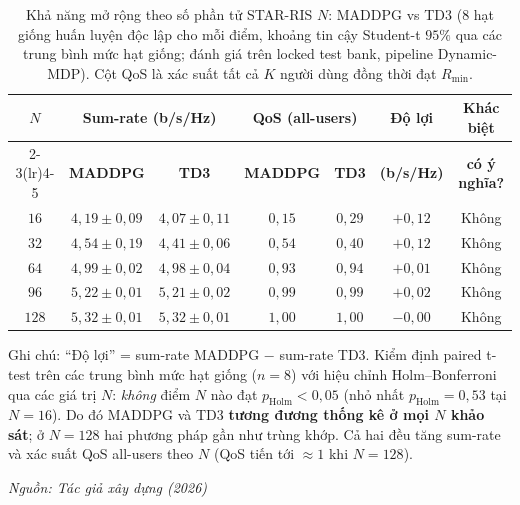 \begin{table}[t]
\centering
\small
\caption{Khả năng mở rộng theo số phần tử STAR-RIS $N$: MADDPG vs TD3 ($8$ hạt giống huấn luyện độc lập cho mỗi điểm, khoảng tin cậy Student-t $95\%$ qua các trung bình mức hạt giống; đánh giá trên locked test bank, pipeline Dynamic-MDP). Cột QoS là xác suất tất cả $K$ người dùng đồng thời đạt $R_{\min}$.}
\label{tab:scalability}
\setlength{\tabcolsep}{4.5pt}
\begin{tabular}{ccccccc}
\toprule
\textbf{$N$} & \multicolumn{2}{c}{\textbf{Sum-rate (b/s/Hz)}} & \multicolumn{2}{c}{\textbf{QoS (all-users)}} & \textbf{Độ lợi} & \textbf{Khác biệt} \\
\cmidrule(lr){2-3}\cmidrule(lr){4-5}
 & \textbf{MADDPG} & \textbf{TD3} & \textbf{MADDPG} & \textbf{TD3} & \textbf{(b/s/Hz)} & \textbf{có ý nghĩa?} \\
\midrule
$16$  & $4{,}19 \pm 0{,}09$ & $4{,}07 \pm 0{,}11$ & $0{,}15$ & $0{,}29$ & $+0{,}12$ & Không \\
$32$  & $4{,}54 \pm 0{,}19$ & $4{,}41 \pm 0{,}06$ & $0{,}54$ & $0{,}40$ & $+0{,}12$ & Không \\
$64$  & $4{,}99 \pm 0{,}02$ & $4{,}98 \pm 0{,}04$ & $0{,}93$ & $0{,}94$ & $+0{,}01$ & Không \\
$96$  & $5{,}22 \pm 0{,}01$ & $5{,}21 \pm 0{,}02$ & $0{,}99$ & $0{,}99$ & $+0{,}02$ & Không \\
$128$ & $5{,}32 \pm 0{,}01$ & $5{,}32 \pm 0{,}01$ & $1{,}00$ & $1{,}00$ & $-0{,}00$ & Không \\
\bottomrule
\end{tabular}

\vspace{0.2em}
{\footnotesize Ghi chú: ``Độ lợi'' = sum-rate MADDPG $-$ sum-rate TD3. Kiểm định paired t-test trên các trung bình mức hạt giống ($n=8$) với hiệu chỉnh Holm--Bonferroni qua các giá trị $N$: \emph{không} điểm $N$ nào đạt $p_{\text{Holm}} < 0{,}05$ (nhỏ nhất $p_{\text{Holm}}=0{,}53$ tại $N=16$). Do đó MADDPG và TD3 \textbf{tương đương thống kê ở mọi $N$ khảo sát}; ở $N=128$ hai phương pháp gần như trùng khớp. Cả hai đều tăng sum-rate và xác suất QoS all-users theo $N$ (QoS tiến tới $\approx 1$ khi $N=128$).\par}
\hfill {\footnotesize\itshape Nguồn: Tác giả xây dựng (2026)}
\end{table}
